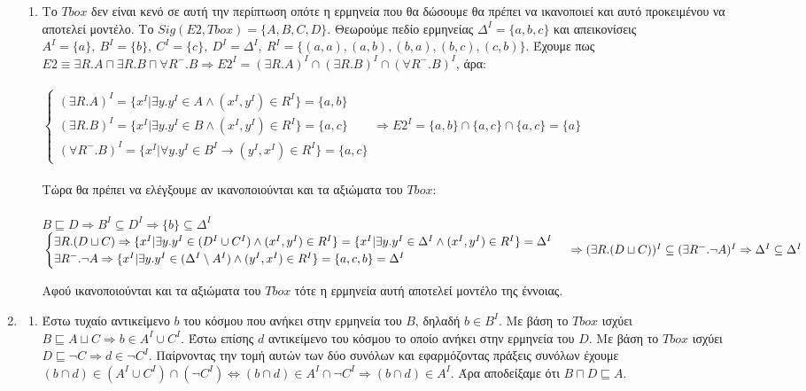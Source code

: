 \documentclass[10pt]{article}
\begin{document}
\begin{enumerate}
\begin{enumerate}
\item Το $Tbox$ δεν είναι κενό σε αυτή την περίπτωση οπότε η ερμηνεία που θα δώσουμε θα πρέπει να ικανοποιεί και αυτό προκειμένου να αποτελεί μοντέλο. Το $Sig(E2, Tbox) = \{A, B, C, D\}$. Θεωρούμε πεδίο ερμηνείας $\Delta^I = \{a, b, c\}$ και απεικονίσεις $A^I = \{a\}, \ B^I = \{b\}, \ C^I = \{c\}, \ D^I = \Delta^I, \ R^I = \{(a, a), (a, b), (b, a), (b, c), (c, b)\}$. Έχουμε πως $E2 \equiv \exists R.A \sqcap \exists R.B \sqcap \forall R^{-}.B \Rightarrow E2^I = (\exists R.A)^I \cap (\exists R.B)^I \cap (\forall R^{-}.B)^I$, άρα:
\\\\
$
\begin{cases}
(\exists R.A)^I = \{x^I |\exists y. y^I \in A \land (x^I, y^I) \in R^I\} = \{a, b\}
\\
(\exists R.B)^I = \{x^I |\exists y. y^I \in B \land (x^I, y^I) \in R^I\} = \{a, c\}
\\
(\forall R^{-}.B)^I = \{x^I |\forall y. y^I \in B^I \rightarrow (y^I, x^I) \in R^I\} = \{a, c\}
\end{cases}
\Rightarrow E2^I = \{a, b\} \cap \{a, c\} \cap \{a, c\} = \{a\}
$
\\\\
Τώρα θα πρέπει να ελέγξουμε αν ικανοποιούνται και τα αξιώματα του $Tbox$:\\\\
$B \sqsubseteq D \Rightarrow B^I \subseteq D^I \Rightarrow \{b\} \subseteq \Delta^I$ \checkmark
\\
$
\begin{cases}
\exists R.(D \sqcup C) \Rightarrow \{x^I |\exists y. y^I \in (D^I \cup C^I) \land (x^I, y^I) \in R^I\} = \{x^I |\exists y. y^I \in \Delta^I \land (x^I, y^I) \in R^I\} = \Delta^I
\\
\exists R^{-}.\neg A \Rightarrow \{x^I|\exists y. y^I \in (\Delta^I \setminus A^I) \land (y^I, x^I) \in R^I\} = \{a, c, b\} = \Delta^I
\end{cases}
\\\\
\Rightarrow (\exists R.(D \sqcup C))^I \subseteq (\exists R^{-}.\neg A)^I \Rightarrow \Delta^I \subseteq \Delta^I
$\checkmark

Αφού ικανοποιούνται και τα αξιώματα του $Tbox$ τότε η ερμηνεία αυτή αποτελεί μοντέλο της έννοιας.
\end{enumerate}
\item
\begin{enumerate}
\item Έστω τυχαίο αντικείμενο $b$ του κόσμου που ανήκει στην ερμηνεία του $B$, δηλαδή $b \in B^I$. Με βάση το $Tbox$ ισχύει $B \sqsubseteq A \sqcup C \Rightarrow b \in A^I \cup C^I$. Έστω επίσης $d$ αντικείμενο του κόσμου το οποίο ανήκει στην ερμηνεία του $D$. Με βάση το $Tbox$ ισχύει $D \sqsubseteq \neg C \Rightarrow d \in \neg C^I$. Παίρνοντας την τομή αυτών των δύο συνόλων και εφαρμόζοντας πράξεις συνόλων έχουμε $(b \cap d) \in (A^I \cup C^I) \cap (\neg C^I) \Leftrightarrow (b \cap d) \in A^I \cap \neg C^I \Rightarrow (b \cap d) \in A^I$. Άρα αποδείξαμε ότι $B \sqcap D \sqsubseteq A$.


\end{enumerate}
\end{enumerate}
\end{document}
